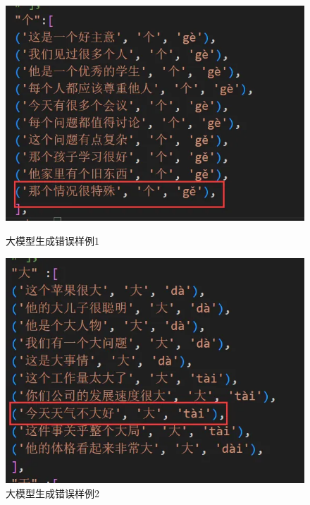\documentclass[12pt,hyperref,a4paper,UTF8]{ctexart}
\begin{document}
\begin{figure}[htbp]
    \centering
    \begin{minipage}[b]{0.45\textwidth}
        \centering
        \includegraphics[width=\textwidth]{figures/image.png} %
        \caption{大模型生成错误样例1}
        \label{fig:image1}
    \end{minipage}
    \hspace{0.05\textwidth} %
    \begin{minipage}[b]{0.45\textwidth}
        \centering
        \includegraphics[width=\textwidth]{figures/image1.png} %
        \caption{大模型生成错误样例2}
        \label{fig:image2}
    \end{minipage}
\end{figure}
\end{document}

